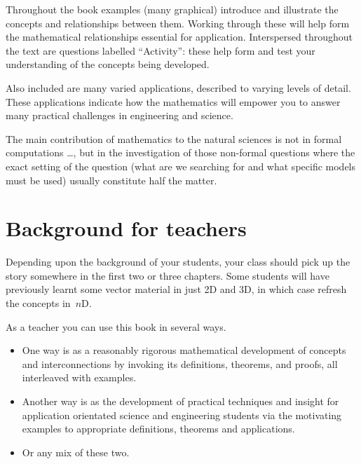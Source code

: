 Throughout the book examples (many graphical) introduce and illustrate the concepts and relationships between them.
Working through these will help form the mathematical relationships essential for application.
Interspersed throughout the text are questions labelled ``Activity'': these help form and test your understanding of the concepts being developed.

Also included are many varied applications, described to varying levels of detail.
These applications indicate how the mathematics will empower you to answer many practical challenges in engineering and science.


\begin{quoted}{\cite[p.xiii]{Arnold2014}}
The main contribution of mathematics to the natural sciences is not in formal computations \ldots, but in the investigation of those non-formal questions where the exact setting of the question (what are we searching for and what specific models must be used) usually constitute half the matter.
%
\end{quoted}








\section*{Background for teachers}

Depending upon the background of your students, your class should pick up the story somewhere in the first two or three chapters.
Some students will have previously learnt some vector material in just 2D and 3D,  in which case refresh the concepts in~\(n\)D.

As a teacher you can use this book in several ways.
\begin{itemize}
\item One way is as a reasonably rigorous mathematical development of concepts and interconnections by invoking its definitions, theorems, and proofs, all interleaved with examples.
\item Another way is as the development of practical techniques and insight for application orientated science and engineering students via the motivating examples to appropriate definitions, theorems and applications. 
\item Or any mix of these two.
\end{itemize}

